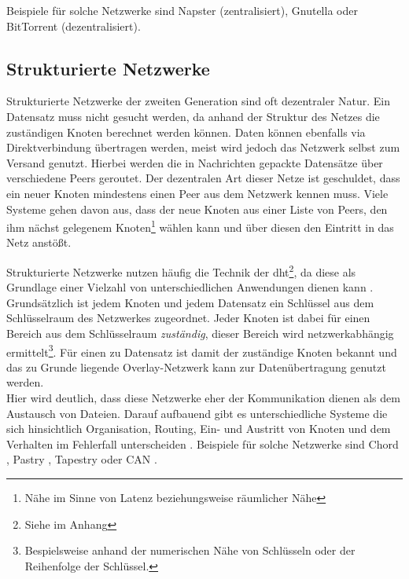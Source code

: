 Beispiele für solche Netzwerke sind Napster (zentralisiert), Gnutella oder BitTorrent (dezentralisiert).

\subsection{Strukturierte Netzwerke}
Strukturierte Netzwerke der zweiten Generation sind oft dezentraler Natur. Ein Datensatz muss nicht gesucht werden, da anhand der Struktur des Netzes die zuständigen Knoten berechnet werden können. Daten können ebenfalls via Direktverbindung übertragen werden, meist wird jedoch das Netzwerk selbst zum Versand genutzt. Hierbei werden die in Nachrichten gepackte Datensätze über verschiedene Peers geroutet. Der dezentralen Art dieser Netze ist geschuldet, dass ein neuer Knoten mindestens einen Peer aus dem Netzwerk kennen muss. Viele Systeme gehen davon aus, dass der neue Knoten aus einer Liste von Peers, den ihm nächst gelegenem Knoten\footnote{Nähe im Sinne von Latenz beziehungsweise räumlicher Nähe} wählen kann und über diesen den Eintritt in das Netz anstößt.

Strukturierte Netzwerke nutzen häufig die Technik der \acf{dht}\footnote{Siehe  im Anhang}, da diese als Grundlage einer Vielzahl von unterschiedlichen Anwendungen dienen kann \cite{Wehrle2005, Ghodsi2006AlgorithmsDHT}. Grundsätzlich ist jedem Knoten und jedem Datensatz ein Schlüssel aus dem Schlüsselraum des Netzwerkes zugeordnet. Jeder Knoten ist dabei für einen Bereich aus dem Schlüsselraum \emph{zuständig}, dieser Bereich wird netzwerkabhängig ermittelt\footnote{Bespielsweise anhand der numerischen Nähe von Schlüsseln oder der Reihenfolge der Schlüssel.}. Für einen zu Datensatz ist damit der zuständige Knoten bekannt und das zu Grunde liegende Overlay-Netzwerk kann zur Datenübertragung genutzt werden.\\
Hier wird deutlich, dass diese Netzwerke eher der Kommunikation dienen als dem Austausch von Dateien. Darauf aufbauend gibt es unterschiedliche Systeme die sich hinsichtlich Organisation, Routing, Ein- und Austritt von Knoten und dem Verhalten im Fehlerfall unterscheiden \cite{Goetz2005, Lua2005Survey}. Beispiele für solche Netzwerke sind Chord \cite{Hosseini2007Survey}, Pastry \cite{Rowstron2001}, Tapestry \cite{Zhao2001Tapestry,Zhao2004Tapestry} oder CAN \cite{Ratnasamy2001Scalable}. 

